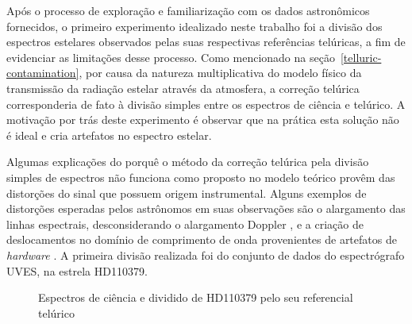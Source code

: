 Após o processo de exploração e familiarização com os dados astronômicos fornecidos, o primeiro experimento idealizado neste trabalho foi a divisão dos espectros estelares observados pelas suas respectivas referências telúricas, a fim de evidenciar as limitações desse processo.
Como mencionado na seção~\ref{telluric-contamination}, por causa da natureza multiplicativa do modelo físico da transmissão da radiação estelar através da atmosfera, a correção telúrica corresponderia de fato à divisão simples entre os espectros de ciência e telúrico. A motivação por trás deste experimento é observar que na prática esta solução não é ideal e cria artefatos no espectro estelar. 

Algumas explicações do porquê o método da correção telúrica pela divisão simples de espectros não funciona como proposto no modelo teórico provêm das distorções do sinal que possuem origem instrumental. Alguns exemplos de distorções esperadas pelos astrônomos em suas observações são o alargamento das linhas espectrais, desconsiderando o alargamento Doppler \citep{LEVENHAGEN2008}, e a criação de deslocamentos no domínio de comprimento de onda provenientes de artefatos de \textit{hardware} \citep[e.g.][]{wavelength-shifts}.
A primeira divisão realizada foi do conjunto de dados do espectrógrafo UVES, na estrela HD110379. 

\begin{figure}[htb]
  \centering
  \hfill
  \caption{Espectros de ciência e dividido de HD110379 pelo seu referencial telúrico}
  \label{fig:hd110379-division}
\end{figure}

